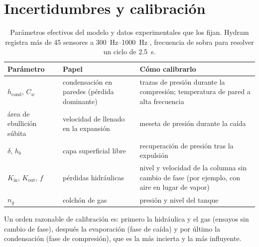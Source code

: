 \documentclass[11pt,a4paper]{article}
\begin{document}
\section{Incertidumbres y calibración}

\begin{table}[ht]
\centering\small
\begin{tabularx}{\linewidth}{@{}l X X@{}}
\toprule
Parámetro & Papel & Cómo calibrarlo \\
\midrule
$h_{\mathrm{cond}}$, $C_w$ & condensación en paredes (pérdida dominante) & trazas de presión durante la compresión; temperatura de pared a alta frecuencia \\
área de ebullición súbita & velocidad de llenado en la expansión & meseta de presión durante la caída \\
$\delta$, $h_b$ & capa superficial libre & recuperación de presión tras la expulsión \\
$K_{\mathrm{in}}$, $K_{\mathrm{out}}$, $f$ & pérdidas hidráulicas & nivel y velocidad de la columna sin cambio de fase (por ejemplo, con aire en lugar de vapor) \\
$n_g$ & colchón de gas & presión y nivel del tanque \\
\bottomrule
\end{tabularx}
\caption{Parámetros efectivos del modelo y datos experimentales que los fijan. Hydram registra más de 45 sensores a \SIrange{300}{1000}{\hertz} \cite{hydramtech}, frecuencia de sobra para resolver un ciclo de \SI{2.5}{\second}.}
\end{table}

\noindent Un orden razonable de calibración es: primero la hidráulica y el gas (ensayos sin cambio de fase), después la evaporación (fase de caída) y por último la condensación (fase de compresión), que es la más incierta y la más influyente.
\end{document}
